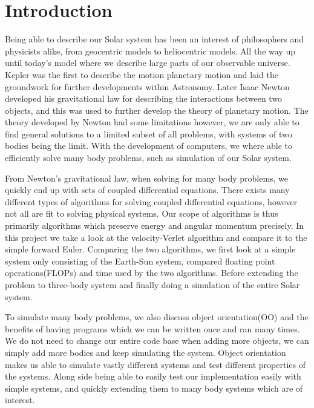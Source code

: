 \documentclass[%
reprint,
nofootinbib,
amsmath,amssymb,
aps,
]{revtex4-1}
\begin{document}
\maketitle 

\section{Introduction} %
Being able to describe our Solar system has been an interest of philosophers and physicists alike, from geocentric models to heliocentric models. All the way up until today's model where we describe large parts of our observable universe. Kepler was the first to describe the motion planetary motion and laid the groundwork for further developments within Astronomy. Later Isaac Newton developed his gravitational law for describing the interactions between two objects, and this was used to further develop the theory of planetary motion. The theory developed by Newton had some limitations however, we are only able to find general solutions to a limited subset of all problems, with systems of two bodies being the limit. 
With the development of computers, we where able to efficiently solve many body problems, such as simulation of our Solar system.

From Newton's gravitational law, when solving for many body problems, we quickly end up with sets of coupled differential equations. There exists many different types of algorithms for solving  coupled differential equations, however not all are fit to solving physical systems. Our scope of algorithms is thus primarily algorithms which preserve energy and angular momentum precisely. In this project we take a look at the velocity-Verlet algorithm and compare it to the simple forward Euler. 
Comparing the two algorithms, we first look at a simple system only consisting of the Earth-Sun system, compared floating point operations(FLOPs) and time used by the two algorithms. Before extending the problem to three-body system and finally doing a simulation of the entire Solar system. 

To simulate many body problems, we also discuss object orientation(OO) and the benefits of having programs which we can be written once and ran many times. We do not need to change our entire code base when adding more objects, we can simply add more bodies and keep simulating the system. Object orientation makes us able to simulate vastly different systems and test different properties of the systems. Along side being able to easily test our implementation easily with simple systems, and quickly extending them to many body systems which are of interest. 
\end{document}
